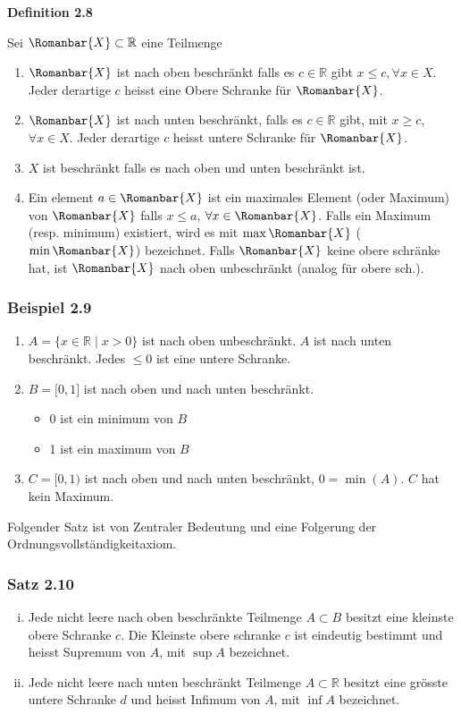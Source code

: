 \begin{framed}
\centerline{\textbf{\textbf{Definition 2.8}}}
\noindent Sei $\Romanbar{X}\subset\mathbb{R}$ eine Teilmenge 
\begin{enumerate}[\indent a)]
\item $\Romanbar{X}$ ist nach oben beschränkt falls es $c\in\mathbb{R}$ gibt $x\leq c, \forall x\in X$. Jeder derartige $c$ heisst eine Obere Schranke für $\Romanbar{X}$.
\item $\Romanbar{X}$ ist nach unten beschränkt, falls es $c\in\mathbb{R}$ gibt, mit $x\geq c$, $\forall x\in X$. Jeder derartige $c$ heisst untere Schranke für $\Romanbar{X}$.
\item $X$ ist beschränkt falls es nach oben und unten beschränkt ist.
\item Ein element $a\in\Romanbar{X}$ ist ein maximales Element (oder Maximum) von $\Romanbar{X}$ falls $x\leq a$, $\forall x\in\Romanbar{X}$. Falls ein Maximum (resp. minimum) existiert, wird es mit $\max\Romanbar{X}$ ($\min\Romanbar{X}$) bezeichnet. Falls $\Romanbar{X}$ keine obere schränke hat, ist $\Romanbar{X}$ nach oben unbeschränkt (analog für obere sch.).
\end{enumerate}
\end{framed}
\subsubsection*{Beispiel 2.9}
\begin{enumerate}
\item $A=\{x\in\mathbb{R}\mid x>0\}$ ist nach oben unbeschränkt. $A$ ist nach unten beschränkt. Jedes $\leq 0$ ist eine untere Schranke. 
\item $B=\lbrack 0,1\rbrack$ ist nach oben und nach unten beschränkt. \begin{itemize}
\item 0 ist ein minimum von $B$
\item 1 ist ein maximum von $B$ 
\end{itemize}
\item $C=\lbrack 0,1)$ ist nach oben und nach unten beschränkt, $0=\min(A)$. $C$ hat kein Maximum. 
\end{enumerate}
Folgender Satz ist von Zentraler Bedeutung und eine Folgerung der Ordnungsvollständigkeitaxiom.

\subsubsection*{Satz 2.10}
\begin{enumerate}[i)]
\item Jede nicht leere nach oben beschränkte Teilmenge $A\subset B$ besitzt eine kleinste obere Schranke $c$. Die Kleinste obere schranke $c$ ist eindeutig bestimmt und heisst Supremum von $A$, mit $\sup A$ bezeichnet. 
\item Jede nicht leere nach unten beschränkt Teilmenge $A\subset\mathbb{R}$ besitzt eine grösste untere Schranke $d$ und heisst Infimum von $A$, mit $\inf A$ bezeichnet.
\end{enumerate}
